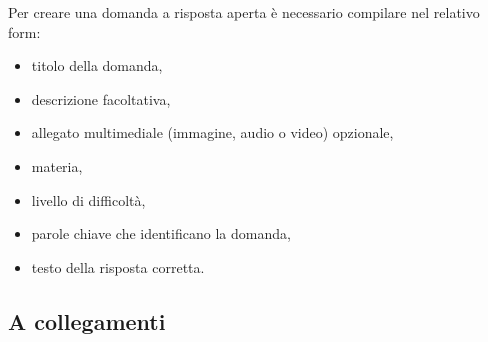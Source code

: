 \documentclass[a4paper, titlepage]{article}
\begin{document}
	 Per creare una domanda a risposta aperta è necessario compilare nel relativo form:
	 \begin{itemize}
	 	\item titolo della domanda,
	 	\item descrizione facoltativa,
	 	\item allegato multimediale (immagine, audio o video) opzionale,
	 	\item materia,
	 	\item livello di difficoltà,
	 	\item parole chiave che identificano la domanda,
	 	\item testo della risposta corretta.
	 \end{itemize}
	 
	 \newpage
	 \subsection{A collegamenti}
\end{document}
